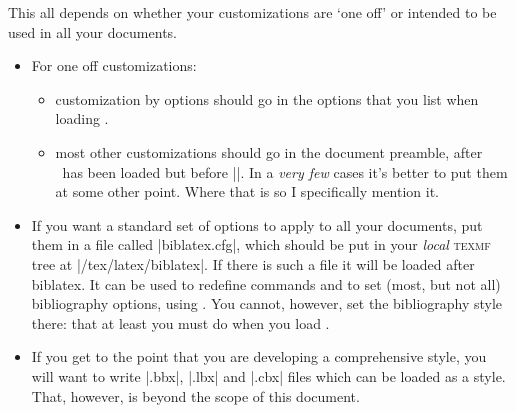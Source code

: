 This all depends on whether your customizations are `one off' or
intended to be used in all your documents.
\begin{itemize}
\item For one off customizations:
\begin{itemize}
\item customization by options should go in the options that you list
  when loading \biblatex.
\item most other customizations should go in the document preamble, after
  \biblatex\ has been loaded but before ||. In a \emph{very
  few} cases it's better to put them at some other point. Where that is so
  I specifically mention it.
\end{itemize}
\item If you want a standard set of options to apply to all your
  documents, put them in a file called |biblatex.cfg|, which should be
  put in your \emph{local} \textsc{texmf} tree at
  |/tex/latex/biblatex|. If there is such a file it will be loaded
  after biblatex. It can be used to redefine commands and to set
  (most, but not all) bibliography options, using
  . You
  cannot, however, set the bibliography style there: that at least you
  must do when you load \biblatex.
\item If you get to the point that you
  are developing a comprehensive style, you will want to write |.bbx|,
  |.lbx| and |.cbx| files which can be loaded as a style. That,
  however, is beyond the scope of this document.
\end{itemize}

